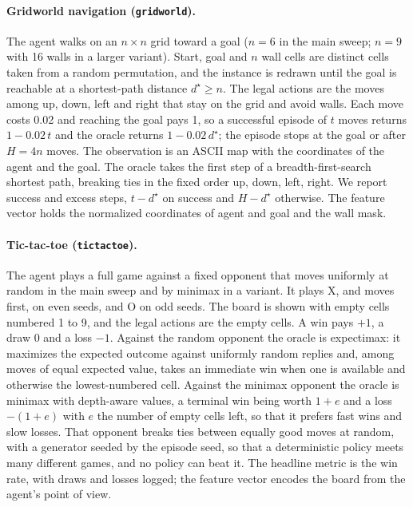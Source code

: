 \paragraph{Gridworld navigation (\texttt{gridworld}).}
The agent walks on an $n\times n$ grid toward a goal ($n=6$ in the main sweep; $n=9$ with 16 walls in a larger variant). Start, goal and $n$ wall cells are distinct cells taken from a random permutation, and the instance is redrawn until the goal is reachable at a shortest-path distance $d^\star\ge n$. The legal actions are the moves among up, down, left and right that stay on the grid and avoid walls. Each move costs 0.02 and reaching the goal pays 1, so a successful episode of $t$ moves returns $1-0.02\,t$ and the oracle returns $1-0.02\,d^\star$; the episode stops at the goal or after $H=4n$ moves. The observation is an ASCII map with the coordinates of the agent and the goal. The oracle takes the first step of a breadth-first-search shortest path, breaking ties in the fixed order up, down, left, right. We report success and excess steps, $t-d^\star$ on success and $H-d^\star$ otherwise. The feature vector holds the normalized coordinates of agent and goal and the wall mask.

\paragraph{Tic-tac-toe (\texttt{tictactoe}).}
The agent plays a full game against a fixed opponent that moves uniformly at random in the main sweep and by minimax in a variant. It plays X, and moves first, on even seeds, and O on odd seeds. The board is shown with empty cells numbered 1 to 9, and the legal actions are the empty cells. A win pays $+1$, a draw 0 and a loss $-1$. Against the random opponent the oracle is expectimax: it maximizes the expected outcome against uniformly random replies and, among moves of equal expected value, takes an immediate win when one is available and otherwise the lowest-numbered cell. Against the minimax opponent the oracle is minimax with depth-aware values, a terminal win being worth $1+e$ and a loss $-(1+e)$ with $e$ the number of empty cells left, so that it prefers fast wins and slow losses. That opponent breaks ties between equally good moves at random, with a generator seeded by the episode seed, so that a deterministic policy meets many different games, and no policy can beat it. The headline metric is the win rate, with draws and losses logged; the feature vector encodes the board from the agent's point of view.

